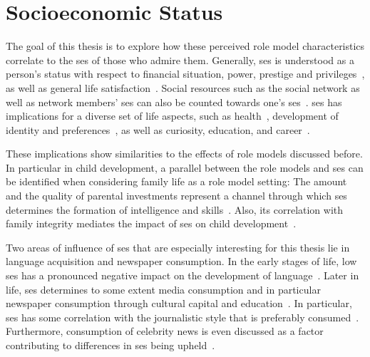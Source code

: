 \section{Socioeconomic Status}\label{ch:ses}
The goal of this thesis is to explore how these perceived role model characteristics correlate to the \gls{ses} of those who admire them. Generally, \gls{ses} is understood as a person's status with respect to financial situation, power, prestige and privileges~\autocite{mueller_measures_1981}, as well as general life satisfaction~\autocite{wagner_german_2007}. Social resources such as the social network as well as network members' \gls{ses} can also be counted towards one's \gls{ses}~\autocite{campbell_social_1986}. \gls{ses} has implications for a diverse set of life aspects, such as health~\autocite{oakes_measurement_2003, braveman_social_2011}, development of identity and preferences~\autocite{bradley_socioeconomic_2002, kraus_social_2012}, as well as curiosity, education, and career~\autocite{broer_review_2019,tucker-drob_socioeconomic_2012,walpole_socioeconomic_2003}. 

These implications show similarities to the effects of role models discussed before. In particular in child development, a parallel between the role models and \gls{ses} can be identified when considering family life as a role model setting: The amount and the quality of parental investments represent a channel through which \gls{ses} determines the formation of intelligence and skills~\autocite{cunha_technology_2007,falk_socioeconomic_2021,cobb-clark_parenting_2019}. Also, its correlation with family integrity mediates the impact of \gls{ses} on child development~\autocite{conger_socioeconomic_2010}.

Two areas of influence of \gls{ses} that are especially interesting for this thesis lie in language acquisition and newspaper consumption. In the early stages of life, low \gls{ses} has a pronounced negative impact on the development of language~\autocite{arriaga_scores_1998,hoff_socioeconomic_2005}. Later in life, \gls{ses} determines to some extent media consumption and in particular newspaper consumption through cultural capital and education~\autocite{york_youth_2015,lee_motivational_2014}. In particular, \gls{ses} has some correlation with the journalistic style that is preferably consumed~\autocite{ohlsson_matter_2017,bergstrom_towards_2019}. Furthermore, consumption of celebrity news is even discussed as a factor contributing to differences in \gls{ses} being upheld~\autocite{dubied_studying_2014}.


